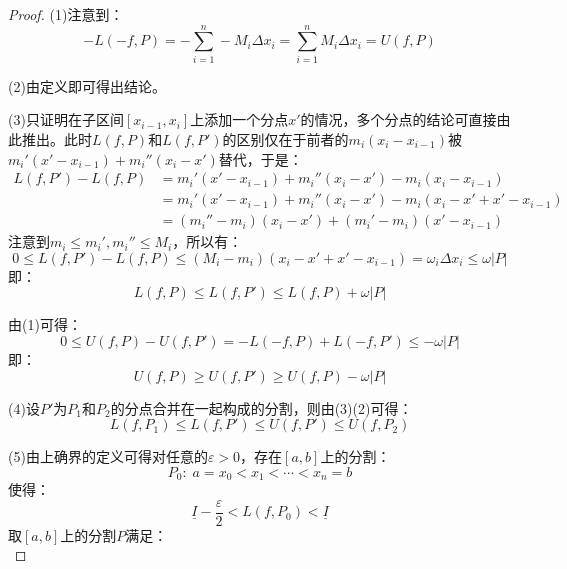 \begin{proof}
	(1)注意到：
	\begin{equation*}
		-L(-f,P)=-\sum_{i=1}^{n}-M_i\Delta x_i=\sum_{i=1}^{n}M_i\Delta x_i=U(f,P)
	\end{equation*}\par
	(2)由定义即可得出结论。\par
	(3)只证明在子区间$[x_{i-1},x_{i}]$上添加一个分点$x'$的情况，多个分点的结论可直接由此推出。此时$L(f,P)$和$L(f,P')$的区别仅在于前者的$m_i(x_i-x_{i-1})$被$m_i'(x'-x_{i-1})+m_i''(x_i-x')$替代，于是：
	\begin{align*}
		L(f,P')-L(f,P)&=m_i'(x'-x_{i-1})+m_i''(x_i-x')-m_i(x_i-x_{i-1}) \\
		&=m_i'(x'-x_{i-1})+m_i''(x_i-x')-m_i(x_i-x'+x'-x_{i-1}) \\
		&=(m_i''-m_i)(x_i-x')+(m_i'-m_i)(x'-x_{i-1})
	\end{align*}
	注意到$m_i\leqslant m_i',m_i''\leqslant M_i$，所以有：
	\begin{equation*}
		0\leqslant L(f,P')-L(f,P)\leqslant(M_i-m_i)(x_i-x'+x'-x_{i-1})=\omega_i\Delta x_i\leqslant\omega|P|
	\end{equation*}
	即：
	\begin{equation*}
		L(f,P)\leqslant L(f,P')\leqslant L(f,P)+\omega|P|
	\end{equation*}\par
	由(1)可得：
	\begin{equation*}
		0\leqslant U(f,P)-U(f,P')=-L(-f,P)+L(-f,P')\leqslant-\omega|P|
	\end{equation*}
	即：
	\begin{equation*}
		U(f,P)\geqslant U(f,P')\geqslant U(f,P)-\omega|P|
	\end{equation*}\par
	(4)设$P'$为$P_1$和$P_2$的分点合并在一起构成的分割，则由(3)(2)可得：
	\begin{equation*}
		L(f,P_1)\leqslant L(f,P')\leqslant U(f,P')\leqslant U(f,P_2)
	\end{equation*}\par
	(5)由上确界的定义可得对任意的$\varepsilon>0$，存在$[a,b]$上的分割：
	\begin{equation*}
		P_0:\;a=x_0<x_1<\cdots<x_n=b
	\end{equation*}
	使得：
	\begin{equation*}
		\underline{I}-\frac{\varepsilon}{2}<L(f,P_0)<\underline{I}
	\end{equation*}
	取$[a,b]$上的分割$P$满足：
	\begin{equation*}

\end{equation*}
\end{proof}
